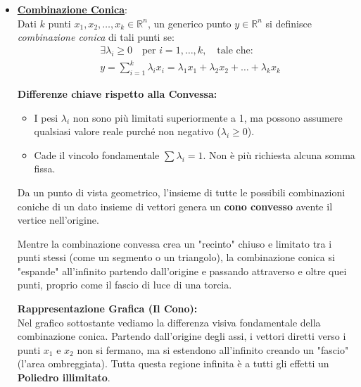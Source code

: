 \documentclass[12pt, a4paper]{article}
\begin{document}
\begin{itemize}
\begin{figure}[H]
			\caption{Esempio di figura NON convessa. La "rientranza" in $x_4$ esclude un'area, violando la regola fondamentale della convessità: il segmento $x_2-x_3$ passa fuori dall'insieme.}
		\end{figure}
		\item \textbf{\underline{Combinazione Conica}}:\\
		Dati $k$ punti $x_1, x_2, \dots, x_k \in \mathbb{R}^n$, un generico punto $y \in \mathbb{R}^n$ si definisce \textit{combinazione conica} di tali punti se:
		\[
		\begin{aligned}
			& \exists \lambda_i \geq 0 \quad \text{per } i = 1, \dots, k, \quad \text{tale che:} \\
			& y = \sum_{i=1}^k \lambda_i x_i = \lambda_1 x_1 + \lambda_2 x_2 + \dots + \lambda_k x_k
		\end{aligned}
		\]
		
		\vspace{0.2cm}
		\textbf{Differenze chiave rispetto alla Convessa:}
		\begin{itemize}
			\item I pesi $\lambda_i$ non sono più limitati superiormente a 1, ma possono assumere qualsiasi valore reale purché non negativo ($\lambda_i \geq 0$).
			\item Cade il vincolo fondamentale $\sum \lambda_i = 1$. Non è più richiesta alcuna somma fissa.
		\end{itemize}
		
		\vspace{0.3cm}
		Da un punto di vista geometrico, l'insieme di tutte le possibili combinazioni coniche di un dato insieme di vettori genera un \textbf{cono convesso} avente il vertice nell'origine. 
		
		Mentre la combinazione convessa crea un "recinto" chiuso e limitato tra i punti stessi (come un segmento o un triangolo), la combinazione conica si "espande" all'infinito partendo dall'origine e passando attraverso e oltre quei punti, proprio come il fascio di luce di una torcia.
		
		\vspace{0.2cm}
		\textbf{Rappresentazione Grafica (Il Cono):}\\
		Nel grafico sottostante vediamo la differenza visiva fondamentale della combinazione conica. Partendo dall'origine degli assi, i vettori diretti verso i punti $x_1$ e $x_2$ non si fermano, ma si estendono all'infinito creando un "fascio" (l'area ombreggiata). 
		Tutta questa regione infinita è a tutti gli effetti un \textbf{Poliedro illimitato}.
		

\end{itemize}
\end{document}
